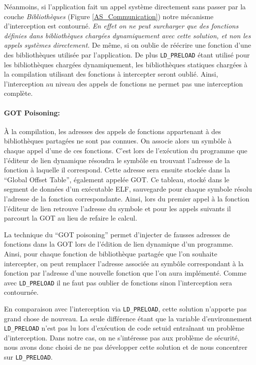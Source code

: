 Néanmoins, si l'application fait un appel système directement sans passer par la
couche \textit{Bibliothèques} (Figure \ref{AS_Communication}) notre mécanisme
d'interception est contourné. \textit{En effet on ne peut surcharger que des
  fonctions définies dans bibliothèques chargées dynamiquement avec cette solution, et non les appels
  systèmes directement.} De même, si on oublie de réécrire une fonction d'une
des bibliothèques utilisée par l'application. De plus \texttt{LD\_PRELOAD} étant utilisé pour les bibliothèques chargées dynamiquement, les bibliothèques statiques chargées à la compilation utilisant des fonctions à intercepter seront oublié. Ainsi, l'interception au niveau des appels de fonctions ne permet pas une interception complète.

\paragraph{GOT Poisoning:}

À la compilation, les adresses des appels de fonctions appartenant à des bibliothèques partagées ne sont pas connues. On associe alors un symbôle à chaque appel d'une de ces fonctions. C'est lors de l'exécution du programme que l'éditeur de lien dynamique résoudra le symbôle en trouvant l'adresse de la fonction à laquelle il correspond. Cette adresse sera ensuite stockée dans la ``Global Offset Table''\citep{ELF}, également appelée GOT. Ce tableau, stocké dans le segment de données d'un exécutable ELF, sauvegarde pour chaque symbole résolu l'adresse de la fonction correspondante. Ainsi, lors du premier appel à la fonction l'éditeur de lien retrouve l'adresse du symbole et pour les appels suivants il parcourt la GOT au lieu de refaire le calcul.

La technique du ``GOT poisoning'' \citep{GOT_poisoning} permet d'injecter de fausses adresses de fonctions dans la GOT lors de l'édition de lien dynamique d'un programme. Ainsi, pour chaque fonction de bibliothèque partagée que l'on souhaite intercepter, on peut remplacer l'adresse associée au symbôle correspondant à la fonction par l'adresse d'une nouvelle fonction que l'on aura implémenté. Comme avec \texttt{LD\_PRELOAD} il ne faut pas oublier de fonctions sinon l'interception sera contournée.

En comparaison avec l'interception via \texttt{LD\_PRELOAD}, cette solution n'apporte pas grand chose de nouveau. La seule différence étant que la variable d'environnement \texttt{LD\_PRELOAD} n'est pas lu lors d'exécution de code setuid entraînant un problème d'interception. Dans notre cas, on ne s'intéresse pas aux problème de sécurité, nous avons donc choisi de ne pas développer cette solution et de nous concentrer sur \texttt{LD\_PRELOAD}.

\vspace{0.5cm}

